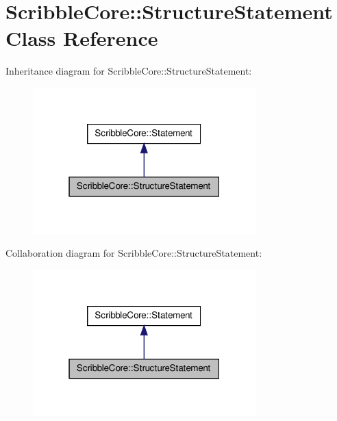 \hypertarget{class_scribble_core_1_1_structure_statement}{\section{Scribble\-Core\-:\-:Structure\-Statement Class Reference}
\label{class_scribble_core_1_1_structure_statement}
}


Inheritance diagram for Scribble\-Core\-:\-:Structure\-Statement\-:\nopagebreak
\begin{figure}[H]
\begin{center}
\leavevmode
\includegraphics[width=244pt]{class_scribble_core_1_1_structure_statement__inherit__graph}
\end{center}
\end{figure}


Collaboration diagram for Scribble\-Core\-:\-:Structure\-Statement\-:\nopagebreak
\begin{figure}[H]
\begin{center}
\leavevmode
\includegraphics[width=244pt]{class_scribble_core_1_1_structure_statement__coll__graph}
\end{center}
\end{figure}
